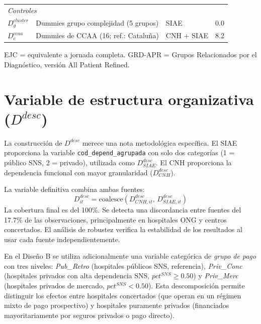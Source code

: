 \documentclass[12pt, a4paper, twoside, openright]{book}
\theoremstyle{plain}
\theoremstyle{definition}
\theoremstyle{remark}
\begin{document}
\begin{table}[htbp]
\begin{threeparttable}
\begin{tabular}{p{2.5cm}p{5cm}p{2.5cm}p{1.5cm}}
\multicolumn{4}{l}{\textit{Controles}} \\
$D^{cluster}_g$ & Dummies grupo complejidad (5 grupos) & SIAE & 0.0 \\
$D^{ccaa}_c$ & Dummies de CCAA (16; ref.: Cataluña) & CNH + SIAE & 8.2 \\
\bottomrule
\end{tabular}
\begin{tablenotes}
  \small
  \item EJC = equivalente a jornada completa. GRD-APR = Grupos Relacionados por el Diagnóstico, versión All Patient Refined.
\end{tablenotes}
\end{threeparttable}
\end{table}

\section{Variable de estructura organizativa (\texorpdfstring{$D^{desc}$}{D\^{}desc})}

La construcción de $D^{desc}$ merece una nota metodológica específica. El SIAE proporciona la variable \texttt{cod\_depend\_agrupada} con solo dos categorías (1 = público SNS, 2 = privado), utilizada como $D^{desc}_{SIAE}$. El CNH proporciona la dependencia funcional con mayor granularidad ($D^{desc}_{CNH}$).

La variable definitiva combina ambas fuentes:
\begin{equation}
  D^{desc}_{it} = \text{coalesce}(D^{desc}_{CNH,it},\, D^{desc}_{SIAE,it})
\end{equation}
La cobertura final es del 100\%. Se detecta una discordancia entre fuentes del 17.7\% de las observaciones, principalmente en hospitales ONG y centros concertados. El análisis de robustez verifica la estabilidad de los resultados al usar cada fuente independientemente.

En el Diseño B se utiliza adicionalmente una variable categórica de \textit{grupo de pago} con tres niveles: \textit{Pub\_Retro} (hospitales públicos SNS, referencia), \textit{Priv\_Conc} (hospitales privados con alta dependencia SNS, $pct^{SNS}\geq 0.50$) y \textit{Priv\_Merc} (hospitales privados de mercado, $pct^{SNS}<0.50$). Esta descomposición permite distinguir los efectos entre hospitales concertados (que operan en un régimen mixto de pago prospectivo) y hospitales puramente privados (financiados mayoritariamente por seguros privados o pago directo).
\end{document}
